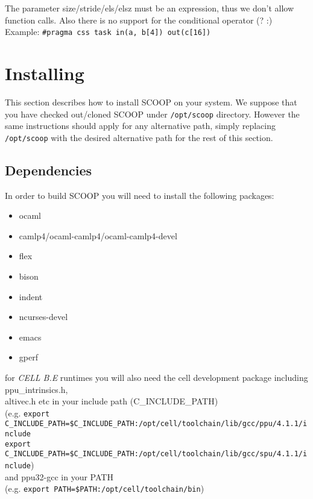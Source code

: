 \documentclass[
a4paper,
12pt,
]{article}
\begin{document}
      The parameter size/stride/els/elsz must be an expression, thus
      we don't allow function calls. Also there is no support for the
      conditional operator (? :)\\

    Example:
      \verb!#pragma css task in(a, b[4]) out(c[16])!


\section{Installing}

This section describes how to install SCOOP on your system.  We
suppose that you have checked out/cloned SCOOP under \verb!/opt/scoop!
directory.  However the same instructions should apply for any
alternative path, simply replacing \verb!/opt/scoop! with the desired
alternative path for the rest of this section.

\subsection{Dependencies}

In order to build SCOOP you will need to install the following
packages:

\begin{itemize}
  \setlength{\itemsep}{1pt}
  \setlength{\parskip}{0pt}
  \setlength{\parsep}{0pt}
  \item ocaml
  \item camlp4/ocaml-camlp4/ocaml-camlp4-devel
  \item flex
  \item bison
  \item indent
  \item ncurses-devel
  \item emacs
  \item gperf
\end{itemize}

\begin{tabbing}
for \emph{CELL B.E} runtimes you will also need the cell development package
including ppu\_intrinsics.h,\\ altivec.h etc in your include path
(C\_INCLUDE\_PATH)\\
  (e.g. \=\verb!export C_INCLUDE_PATH=$C_INCLUDE_PATH:/opt/cell/toolchain/lib/gcc/ppu/4.1.1/include!\\
   \>\verb!export C_INCLUDE_PATH=$C_INCLUDE_PATH:/opt/cell/toolchain/lib/gcc/spu/4.1.1/include!)\\
  and ppu32-gcc in your PATH\\
  (e.g. \verb!export PATH=$PATH:/opt/cell/toolchain/bin!)\\
\end{tabbing}
\end{document}
